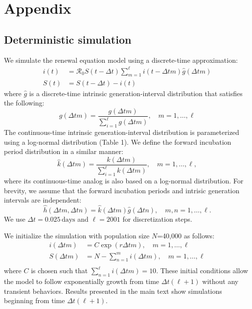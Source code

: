 \documentclass[12pt]{article}
\begin{document}
\pagebreak

\section{Appendix}

\subsection{Deterministic simulation}

We simulate the renewal equation model using a discrete-time approximation:
\begin{equation}
\begin{aligned}
i(t) &= \mathcal R_0 S(t-\Delta t) \sum_{m=1}^{\ell} i(t-\Delta t m) \hat{g}(\Delta t m) \\
S(t) &= S(t-\Delta t) - i(t)
\end{aligned}
\end{equation}
where $\hat{g}$ is a discrete-time intrinsic generation-interval distribution that satisfies the following:
\begin{equation}
\hat{g}(\Delta t m) = \frac{g(\Delta t m)}{\sum_{i=1}^\ell g(\Delta t m)}, \quad m=1, \dots, \ell
\end{equation}
The continuous-time intrinsic generation-interval distribution is parameterized using a log-normal distribution (Table 1). We define the forward incubation period distribution in a similar manner:
\begin{equation}
\hat{k}(\Delta t m) = \frac{k(\Delta t m)}{\sum_{i=1}^\ell k(\Delta t m)}, \quad m=1, \dots, \ell,
\end{equation}
where its continuous-time analog is also based on a log-normal distribution.
For brevity, we assume that the forward incubation periods and intrisic generation intervals are independent:
\begin{equation}
\hat{h}(\Delta t m, \Delta t n) = \hat{k}(\Delta t m)\hat{g}(\Delta t n), \quad m,n=1, \dots, \ell.
\end{equation}
We use $\Delta t = 0.025\,\textrm{days}$ and $\ell=2001$ for discretization steps.

We initialize the simulation with population size $N$=40,000 as follows:
\begin{equation}
\begin{aligned}
i(\Delta t m) &= C \exp(r \Delta t m), \quad m=1, \dots, \ell\\
S(\Delta t m) &= N - \sum_{n=1}^m i(\Delta t m), \quad m=1, \dots, \ell\\
\end{aligned}
\end{equation}
where $C$ is chosen such that $\sum_{n=1}^\ell i(\Delta t m)=10$.
These initial conditions allow the model to follow exponentially growth from time $\Delta t (\ell + 1)$ without any transient behaviors.
Results presented in the main text show simulations beginning from time $\Delta t (\ell + 1)$.
\end{document}

